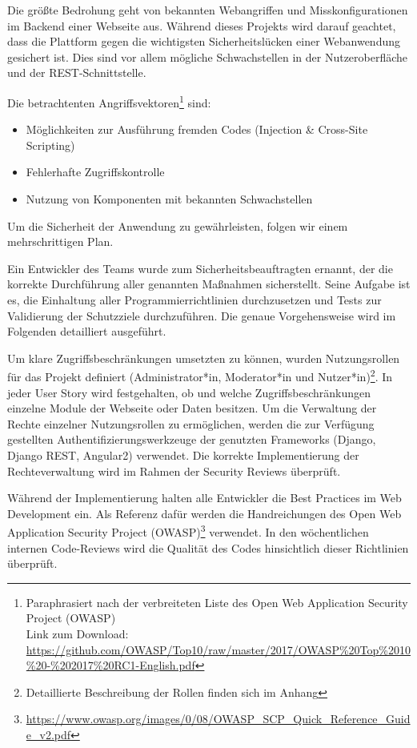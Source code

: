 Die größte Bedrohung geht von bekannten Webangriffen und Misskonfigurationen im Backend einer Webseite aus. Während dieses Projekts wird darauf geachtet, dass die Plattform gegen die wichtigsten Sicherheitslücken einer Webanwendung gesichert ist. Dies sind vor allem mögliche Schwachstellen in der Nutzeroberfläche und der REST-Schnittstelle.

Die betrachtenten Angriffsvektoren\footnote{Paraphrasiert nach der verbreiteten Liste des Open Web Application Security Project (OWASP)\\Link zum Download:  \href{https://github.com/OWASP/Top10/raw/master/2017/OWASP\%20Top\%2010\%20-\%202017\%20RC1-English.pdf}{https://github.com/OWASP/Top10/raw/master/2017/OWASP\%20Top\%2010\%20-\%202017\%20RC1-English.pdf}} sind:
\begin{itemize}
\item Möglichkeiten zur Ausführung fremden Codes (Injection \& Cross-Site Scripting)
\item Fehlerhafte Zugriffskontrolle
\item Nutzung von Komponenten mit bekannten Schwachstellen
\end{itemize}

Um die Sicherheit der Anwendung zu gewährleisten, folgen wir einem mehrschrittigen Plan.

Ein Entwickler des Teams wurde zum Sicherheitsbeauftragten ernannt, der die korrekte Durchführung aller genannten Maßnahmen sicherstellt. Seine Aufgabe ist es, die Einhaltung aller Programmierrichtlinien durchzusetzen und Tests zur Validierung der Schutzziele durchzuführen. Die genaue Vorgehensweise wird im Folgenden detailliert ausgeführt.

Um klare Zugriffsbeschränkungen umsetzten zu können, wurden Nutzungsrollen für das Projekt definiert (Administrator*in, Moderator*in und Nutzer*in)\footnote{Detaillierte Beschreibung der Rollen finden sich im Anhang}. In jeder User Story wird festgehalten, ob und welche Zugriffsbeschränkungen einzelne Module der Webseite oder Daten besitzen. Um die Verwaltung der Rechte einzelner Nutzungsrollen zu ermöglichen, werden die zur Verfügung gestellten Authentifizierungswerkzeuge der genutzten Frameworks (Django, Django REST, Angular2) verwendet. Die korrekte Implementierung der Rechteverwaltung wird im Rahmen der Security Reviews überprüft.

Während der Implementierung halten alle Entwickler die Best Practices im Web Development ein. Als Referenz dafür werden die Handreichungen des Open Web Application Security Project (OWASP)\footnote{\href{https://www.owasp.org/images/0/08/OWASP_SCP_Quick_Reference_Guide_v2.pdf}{https://www.owasp.org/images/0/08/OWASP\_SCP\_Quick\_Reference\_Guide\_v2.pdf}} verwendet. In den wöchentlichen internen Code-Reviews wird die Qualität des Codes hinsichtlich dieser Richtlinien überprüft.

